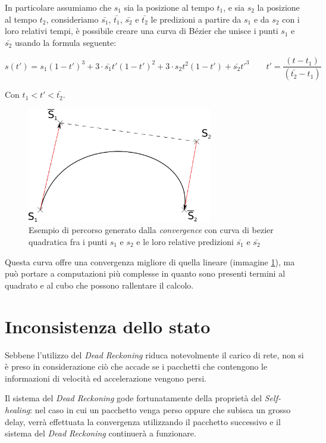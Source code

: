 \documentclass[a4paper,11pt]{article}
\begin{document}
In particolare assumiamo che $s_1$ sia la posizione al tempo $t_1$, e sia $s_2$ la posizione al tempo $t_2$, consideriamo $\bar{s_1}$, $\bar{t_1}$, $\bar{s_2}$ e $\bar{t_2}$ le predizioni a partire da $s_1$ e da $s_2$ con i loro relativi tempi, \`e possibile creare una curva di B\'ezier che unisce i punti $s_1$ e $\bar{s_2}$ usando la formula seguente:

$$ s(t') = s_1(1 - t')^3 + 3 \cdot \bar{s_1} t' (1 - t')^2 + 3 \cdot s_2 t^2(1 - t') + \bar{s_2}t'^3 \qquad t' = \frac{(t - t_1)}{(\bar{t_2} - t_1)}$$

Con $t_1 < t' < \bar{t_2}$.

\begin{figure}[ht]
\centering
\includegraphics[height=5cm]{bez.png}
\caption{\small{Esempio di percorso generato dalla \emph{convergence} con curva di bezier quadratica fra i punti $s_1$ e $s_2$ e le loro relative predizioni $\bar{s_1}$ e $\bar{s_2}$}}
\label{img:bez}
\end{figure}

Questa curva offre una convergenza migliore di quella lineare (immagine \ref{img:bez}), ma pu\`o portare a computazioni pi\`u complesse in quanto sono presenti termini al quadrato e al cubo che possono rallentare il calcolo.

\section{Inconsistenza dello stato}

Sebbene l'utilizzo del \emph{Dead Reckoning} riduca notevolmente il carico di rete, non si \`e preso in considerazione ci\`o che accade se i pacchetti che contengono le informazioni di velocit\`a ed accelerazione vengono persi.

Il sistema del \emph{Dead Reckoning} gode fortunatamente della propriet\`a del \emph{Self-healing}: nel caso in cui un pacchetto venga perso oppure che subisca un grosso delay, verr\`a effettuata la convergenza utilizzando il pacchetto successivo e il sistema del \emph{Dead Reckoning} continuer\`a a funzionare.
\end{document}
